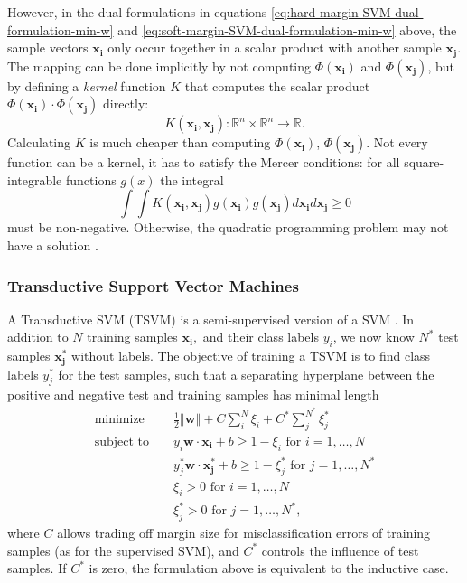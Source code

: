 However, in the dual formulations in equations \ref{eq:hard-margin-SVM-dual-formulation-min-w}
and \ref{eq:soft-margin-SVM-dual-formulation-min-w} above, the sample
vectors $\mathbf{x_{i}}$ only occur together in a scalar product
with another sample $\mathbf{x_{j}}$. The mapping can be done implicitly
by not computing $\Phi(\mathbf{x_{i}})$ and $\Phi(\mathbf{x_{j}})$,
but by defining a \emph{kernel }function $K$ that computes the scalar
product $\Phi(\mathbf{x_{i}})\cdot\Phi(\mathbf{x_{j}})$ directly:
\[
K(\mathbf{x_{i}},\mathbf{x_{j}}):\mathbb{R}^{n}\times\mathbb{R}^{n}\rightarrow\mathbb{R}.
\]
Calculating $K$ is much cheaper than computing $\Phi(\mathbf{x_{i}})$,
$\Phi(\mathbf{x_{j}})$. Not every function can be a kernel, it has
to satisfy the Mercer conditions: for all square-integrable functions
$g(x)$ the integral 
\[
\int\int K(\mathbf{x_{i}},\mathbf{x_{j}})g(\mathbf{x_{i}})g(\mathbf{x_{j}})d\mathbf{x_{i}}d\mathbf{x_{j}}\geq0
\]
 must be non-negative. Otherwise, the quadratic programming problem
may not have a solution \cite{StatnikovGuyon2011}.

\subsubsection{Transductive Support Vector Machines\label{subsec:Transductive-Support-Vector-Machines}}

A Transductive SVM  (TSVM) 
is a semi-supervised version of a SVM \cite{Joachims1999a}. In addition
to $N$ training samples $\mathbf{x_{i}},$ and their class labels
$y_{i}$, we now know $N^{*}$ test samples $\mathbf{x_{j}^{*}}$
without labels. The objective of training a TSVM is to find class
labels $y_{j}^{*}$ for the test samples, such that a separating hyperplane
between the positive and negative test and training samples has minimal
length
\begin{eqnarray*}
\mbox{minimize } &  & \frac{1}{2}\left\Vert \mathbf{w}\right\Vert +C\sum_{i}^{N}\xi_{i}+C^{*}\sum_{j}^{N^{*}}\xi_{j}^{*}\\
\mbox{subject to } &  & y_{i}\mathbf{w}\cdot\mathbf{x_{i}}+b\geq1-\xi_{i}\mbox{ for }i=1,\ldots,N\\
 &  & y_{j}^{*}\mathbf{w}\cdot\mathbf{x_{j}^{*}}+b\geq1-\xi_{j}^{*}\mbox{ for }j=1,\ldots,N^{*}\\
 &  & \xi_{i}>0\mbox{ for }i=1,\ldots,N\\
 &  & \xi_{j}^{*}>0\mbox{ for }j=1,\ldots,N^{*},
\end{eqnarray*}
where $C$ allows trading off margin size for misclassification errors
of training samples (as for the supervised SVM), and $C^{*}$ controls
the influence of test samples. If $C^{*}$ is zero, the formulation
above is equivalent to the inductive case.

